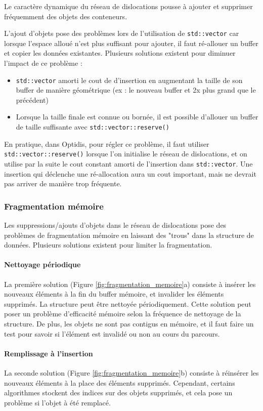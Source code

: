Le caractère dynamique du réseau de dislocations pousse à ajouter et supprimer fréquemment des objets des conteneurs. 

L'ajout d'objets pose des problèmes lors de l'utilisation de \verb|std::vector| car lorsque l'espace alloué n'est plus suffisant pour ajouter, il faut ré-allouer un buffer et copier les données existantes. Plusieurs solutions existent pour diminuer l'impact de ce problème :
\begin{itemize}
	\item \verb|std::vector| amorti le cout de d'insertion en augmentant la taille de son buffer de manière géométrique (ex : le nouveau buffer et 2x plus grand que le précédent)
	\item Lorsque la taille finale est connue ou bornée, il est possible d'allouer un buffer de taille suffisante avec \verb|std::vector::reserve()|
\end{itemize}
En pratique, dans Optidis, pour régler ce problème, il faut utiliser \verb|std::vector::reserve()| lorsque l'on initialise le réseau de dislocations, et on utilise par la suite le cout constant amorti de l'insertion dans \verb|std::vector|. Une insertion qui déclenche une ré-allocation aura un cout important, mais ne devrait pas arriver de manière trop fréquente.

\subsubsection{Fragmentation mémoire}
\label{sec:fragmentation_memoire}

Les suppressions/ajouts d'objets dans le réseau de dislocations pose des problèmes de fragmentation mémoire en laissant des "trous" dans la structure de données. Plusieurs solutions existent pour limiter la fragmentation.

\paragraph{Nettoyage périodique}
La première solution (Figure \ref{fig:fragmentation_memoire}a) consiste à insérer les nouveaux éléments à la fin du buffer mémoire, et invalider les éléments supprimés. La structure peut être nettoyée périodiquement. Cette solution peut poser un problème d'efficacité mémoire selon la fréquence de nettoyage de la structure. De plus, les objets ne sont pas contigus en mémoire, et il faut faire un test pour savoir si l'élément est invalidé ou non au cours du parcours.

\paragraph{Remplissage à l'insertion}
La seconde solution (Figure \ref{fig:fragmentation_memoire}b) consiste à réinsérer les nouveaux éléments à la place des éléments supprimés. Cependant, certains algorithmes stockent des indices sur des objets supprimés, et cela pose un problème si l'objet à été remplacé.

